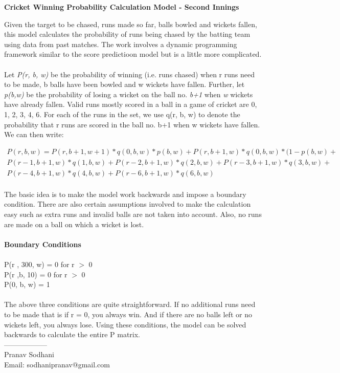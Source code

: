 \documentclass{article}
\begin{document}
\begin{center} 
\Large{\textbf{Cricket Winning Probability Calculation Model - Second Innings}}
\end{center}
\vspace{5mm}
Given the target to be chased, runs made so far, balls bowled and wickets fallen, this model calculates the probability of runs being chased by the batting team using data from past matches. The work involves a dynamic programming framework similar to the score predictioon model but is a little more complicated. 
\\
\\
 Let \textit{P(r, b, w)} be the probability of winning (i.e. runs chased) when r runs need to be made, b balls have been bowled and w wickets have fallen. Further, let \textit{p(b,w)} be the probability of losing a wicket on the ball no. \textit{b+1} when \textit{w} wickets have already fallen. Valid runs mostly scored in a ball in a game of cricket are {0, 1, 2, 3, 4, 6}. For each of the runs in the set, we use q(r, b, w) to denote the probability that r runs are scored in the ball no. b+1 when w wickets have fallen. We can then write:

\begin{equation}
\begin{split}
P(r, b, w) = P(r,b+1,w+1)*q(0,b,w)*p(b,w) + P(r,b+1,w)*q(0,b,w)*(1 - p(b,w) + \\
P(r-1, b+1,w)*q(1,b,w) + P(r-2,b+1,w)*q(2,b,w) + P(r-3,b+1,w)*q(3,b,w) + \\
P(r-4,b+1,w)*q(4,b,w) + P(r-6,b+1,w)*q(6,b,w) \\
\end{split}
\end{equation}

The basic idea is to make the model work backwards and impose a boundary condition. There are also certain assumptions involved to make the calculation easy such as extra runs and invalid balls are not taken into account. Also, no runs are made on a ball on which a wicket is lost.
\\
\\
\textbf{Boundary Conditions}
\\ \\
P(r , 300, w) = 0  for r $>$ 0\\ 
P(r ,b, 10) = 0  for r $>$ 0\\
P(0, b, w) = 1 \\ \\
The above three conditions are quite straightforward. If no additional runs need to be made that is if r = 0, you always win. And if there are no balls left or no wickets left, you always lose. Using these conditions, the model can be solved backwards to calculate the entire P matrix.
\vspace{5mm}
\\
------------------\\
Pranav Sodhani \\
Email: sodhanipranav@gmail.com 
\end{document}
